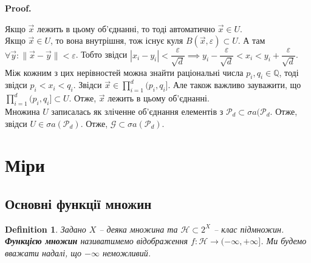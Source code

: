 \documentclass[a4paper, 10pt]{article}
\makeatletter
\theoremstyle{theoremdd}
\newtheorem{definition}[theorem]{Definition}
\renewenvironment{proof}[1][Proof.\\]{\par
\pushQED{\hfill \qed}%
\normalfont \topsep6\p@\@plus6\p@\relax
\trivlist
\item\relax
{\bfseries
#1\@addpunct{.}}\hspace\labelsep\ignorespaces
}{%
\popQED\endtrivlist\@endpefalse
}
\makeatother
\begin{document}
\begin{proof}
Якщо $\vec{x}$ лежить в цьому об'єднанні, то тоді автоматично $\vec{x} \in U$.\\
Якщо $\vec{x} \in U$, то вона внутрішня, тож існує куля $B(\vec{x},\varepsilon) \subset U$. А там $\forall \vec{y}: \| \vec{x} - \vec{y} \| < \varepsilon$. Тобто звідси $|x_i-y_i| < \dfrac{\varepsilon}{\sqrt{d}} \implies y_i - \dfrac{\varepsilon}{\sqrt{d}} < x_i < y_i + \dfrac{\varepsilon}{\sqrt{d}}$. Між кожним з цих нерівностей можна знайти раціональні числа $p_i,q_i \in \mathbb{Q}$, тоді звідси $p_i < x_i < q_i$. Звідси $\vec{x} \in \displaystyle\prod_{i=1}^d (p_i,q_i]$. Але також важливо зауважити, що $\displaystyle\prod_{i=1}^d (p_i,q_i] \subset U$. Отже, $\vec{x}$ лежить в цьому об'єднанні.\\
Множина $U$ записалась як зліченне об'єднання елементів з $\mathcal{P}_d \subset \sigma a(\mathcal{P}_d$. Отже, звідси $U \in \sigma a(\mathcal{P}_d)$. Отже, $\mathcal{G} \subset \sigma a(\mathcal{P}_d)$.
\end{proof}
\newpage

\section{Міри}
\subsection{Основні функції множин}
\begin{definition}
Задано $X$ -- деяка множина та $\mathcal{H} \subset 2^X$ -- клас підмножин.\\
\textbf{Функцією множин} називатимемо відображення $f \colon \mathcal{H} \to (-\infty,+\infty]$. Ми будемо вважати надалі, що $-\infty$ неможливий.
\end{definition}
\end{document}
